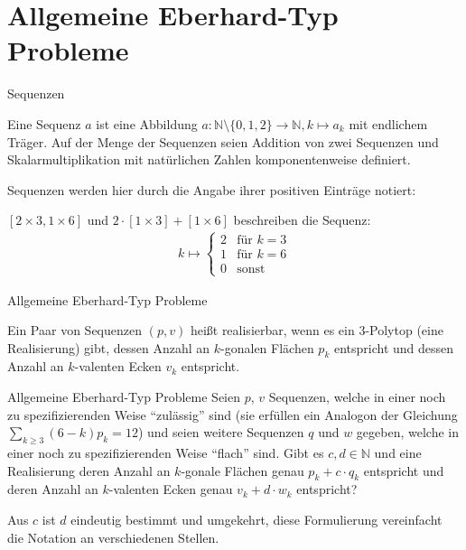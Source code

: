 \documentclass[10pt, notheorems]{beamer}
\newcommand{\set}[1]{\{ #1 \}}
\newcommand{\nats}{\mathbb{N}}
\newcommand{\hdef}[1]{\textcolor{darkred2}{#1}}
\begin{document}
\section{Allgemeine {\sc Eberhard}-Typ Probleme}
\begin{frame}{Sequenzen}
  \begin{definition}[Sequenz]
    Eine \hdef{Sequenz} $a$ ist eine Abbildung $a : \nats \setminus \set{0, 1, 2} \to \nats, k \mapsto a_k$ mit endlichem Träger. Auf der Menge der Sequenzen seien Addition von zwei Sequenzen und Skalarmultiplikation mit natürlichen Zahlen komponentenweise definiert.
  \end{definition}
  \pause
  Sequenzen werden hier durch die Angabe ihrer positiven Einträge notiert:
  \begin{example}
    $[2 \times 3, 1 \times 6]$ und $2 \cdot [1 \times 3] + [1 \times 6]$ beschreiben die Sequenz:
    \begin{align*}
      k \mapsto \begin{cases} 2 & \text{für } k = 3\\ 1 & \text{für } k = 6\\ 0 & \text{sonst}\end{cases}
    \end{align*}
  \end{example}
\end{frame}
\begin{frame}{Allgemeine {\sc Eberhard}-Typ Probleme}
  \begin{definition}
    Ein Paar von Sequenzen $(p, v)$ heißt realisierbar, wenn es ein $3$-Polytop (eine Realisierung) gibt, dessen Anzahl an $k$-gonalen Flächen $p_k$ entspricht und dessen Anzahl an $k$-valenten Ecken $v_k$ entspricht.
  \end{definition}
  \pause
  \begin{block}{Allgemeine {\sc Eberhard}-Typ Probleme}
    Seien $p$, $v$ Sequenzen, welche in einer noch zu spezifizierenden Weise ``zulässig'' sind (sie erfüllen ein Analogon der Gleichung $\sum_{k \geq 3} (6 - k) p_k = 12$) und seien weitere Sequenzen $q$ und $w$ gegeben, welche in einer noch zu spezifizierenden Weise ``flach'' sind. Gibt es $c, d \in \nats$ und eine Realisierung deren Anzahl an $k$-gonale Flächen genau $p_k + c \cdot q_k$ entspricht und deren Anzahl an $k$-valenten Ecken genau $v_k + d \cdot w_k$ entspricht?
  \end{block}
  \pause
  Aus $c$ ist $d$ eindeutig bestimmt und umgekehrt, diese Formulierung vereinfacht die Notation an verschiedenen Stellen.
\end{frame}
\end{document}
